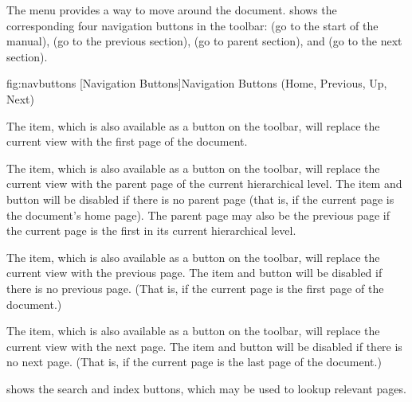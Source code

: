 The  menu provides a way to move around
the document.
 shows the corresponding four navigation
buttons in the toolbar:  (go to the
start of the manual),  (go to the
previous section),  (go to parent
section), and  (go to the next
section).

\FloatFig
{fig:navbuttons}
{%
}
[Navigation Buttons]{Navigation Buttons (Home, Previous, Up, Next)}


The  item, which is also available
as a button on the toolbar, will replace the current view with the
first page of the document.


The  item, which is also available
as a button on the toolbar, will replace the current view with the
parent page of the current hierarchical level. The item and button
will be disabled if there is no parent page (that is, if the current
page is the document's home page). The parent page may
also be the previous page if the current page is the first in its
current hierarchical level.


The  item, which is also available as
a button on the toolbar, will replace the current view with the
previous page. The item and button will be disabled if there is no
previous page. (That is, if the current page is the first
page of the document.)


The  item, which is also available as
a button on the toolbar, will replace the current view with the
next page. The item and button will be disabled if there is no
next page. (That is, if the current page is the last
page of the document.)

 shows the search and index buttons,
which may be used to lookup relevant pages.

